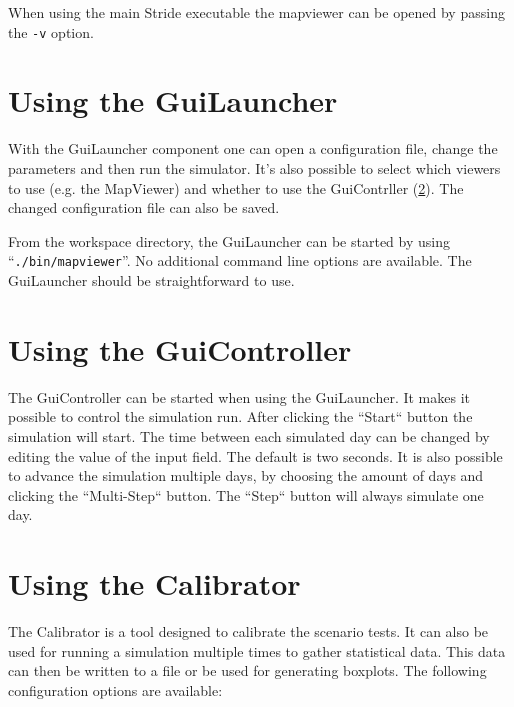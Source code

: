 When using the main Stride executable the mapviewer can be opened by passing the \texttt{-v} option.

\section{Using the GuiLauncher}

With the GuiLauncher component one can open a configuration file, change the parameters and then run the simulator. It's also possible to select which viewers to use (e.g. the MapViewer) and whether to use the GuiContrller (\ref{sec:guicontroller}). The changed configuration file can also be saved.

From the workspace directory, the GuiLauncher can be started by using \mbox{``\texttt{./bin/mapviewer}''}. No additional command line options are available.
The GuiLauncher should be straightforward to use.

\section{Using the GuiController}
\label{sec:guicontroller}

The GuiController can be started when using the GuiLauncher. It makes it possible to control the simulation run.
After clicking the ``Start`` button the simulation will start. The time between each simulated day can be changed by editing the value of the input field. The default is two seconds.
It is also possible to advance the simulation multiple days, by choosing the amount of days and clicking the ``Multi-Step`` button.
The ``Step`` button will always simulate one day.

\section{Using the Calibrator}
\label{sec:calibrator}

The Calibrator is a tool designed to calibrate the scenario tests.
It can also be used for running a simulation multiple times to gather statistical data.
This data can then be written to a file or be used for generating boxplots.
The following configuration options are available:

